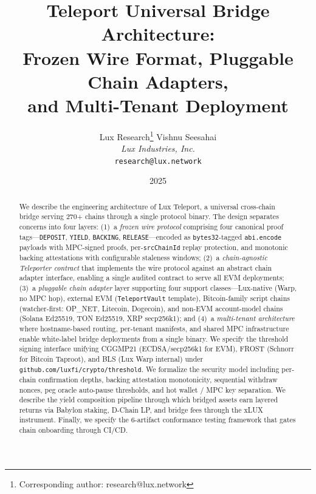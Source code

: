 \documentclass[11pt]{article}
\title{Teleport Universal Bridge Architecture:\\Frozen Wire Format, Pluggable Chain Adapters,\\and Multi-Tenant Deployment}
\author{
Lux Research\thanks{Corresponding author: research@lux.network}
\quad
Vishnu Seesahai\\
\textit{Lux Industries, Inc.}\\
\texttt{research@lux.network}
}
\date{2025}
\begin{document}
\luxcoverpage

\begin{abstract}
We describe the engineering architecture of Lux Teleport, a universal cross-chain bridge serving 270+ chains through a single protocol binary. The design separates concerns into four layers: (1)~a \emph{frozen wire protocol} comprising four canonical proof tags---\texttt{DEPOSIT}, \texttt{YIELD}, \texttt{BACKING}, \texttt{RELEASE}---encoded as \texttt{bytes32}-tagged \texttt{abi.encode} payloads with MPC-signed proofs, per-\texttt{srcChainId} replay protection, and monotonic backing attestations with configurable staleness windows; (2)~a \emph{chain-agnostic Teleporter contract} that implements the wire protocol against an abstract chain adapter interface, enabling a single audited contract to serve all EVM deployments; (3)~a \emph{pluggable chain adapter} layer supporting four support classes---Lux-native (Warp, no MPC hop), external EVM (\texttt{TeleportVault} template), Bitcoin-family script chains (watcher-first: OP\_NET, Litecoin, Dogecoin), and non-EVM account-model chains (Solana Ed25519, TON Ed25519, XRP secp256k1); and (4)~a \emph{multi-tenant architecture} where hostname-based routing, per-tenant manifests, and shared MPC infrastructure enable white-label bridge deployments from a single binary. We specify the threshold signing interface unifying CGGMP21 (ECDSA/secp256k1 for EVM), FROST (Schnorr for Bitcoin Taproot), and BLS (Lux Warp internal) under \texttt{github.com/luxfi/crypto/threshold}. We formalize the security model including per-chain confirmation depths, backing attestation monotonicity, sequential withdraw nonces, peg oracle auto-pause thresholds, and hot wallet / MPC key separation. We describe the yield composition pipeline through which bridged assets earn layered returns via Babylon staking, D-Chain LP, and bridge fees through the xLUX instrument. Finally, we specify the 6-artifact conformance testing framework that gates chain onboarding through CI/CD.
\end{abstract}

\tableofcontents













\end{document}
